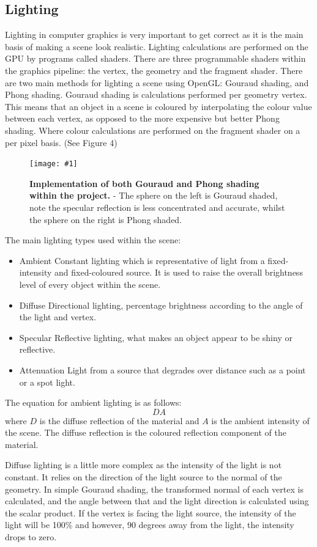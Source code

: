 \documentclass[conference]{acmsiggraph}
\newcommand{\figuremacroW}[4]{
	\begin{figure}[h] %
		\centering
		\texttt{[image: \#1]}
		\caption[#2]{\textbf{#2} - #3}
		\label{fig:#1}
	\end{figure}
}
\begin{document}
\subsection{Lighting}
Lighting in computer graphics is very important to get correct as it is the main basis of making a scene look realistic. Lighting calculations are performed on the GPU by programs called shaders. There are three programmable shaders within the graphics pipeline: the vertex, the geometry and the fragment shader.
    There are two main methods for lighting a scene using OpenGL: Gouraud shading, and Phong shading.
Gouraud shading is %
calculations performed per geometry vertex. This means that an object in a scene is coloured by interpolating the colour value between each vertex, as opposed to the more expensive but better Phong shading. Where colour calculations are performed on the fragment shader on a per pixel basis. (See Figure 4)

\figuremacroW
{gouraudPhong}
{Implementation of both Gouraud and Phong shading within the project. }
{The sphere on the left is Gouraud shaded, note the specular reflection is less concentrated and accurate, whilst the sphere on the right is Phong shaded.}
{1.0}

The main lighting types used within the scene:
\begin{itemize}
    \item {Ambient} Constant lighting which is representative of light from a fixed-intensity and fixed-coloured source. It is used to raise the overall brightness level of every object within the scene. 
    \item {Diffuse} Directional lighting, percentage brightness according to the angle of the light and vertex.
    \item {Specular} Reflective lighting, what makes an object appear to be shiny or reflective.
    \item {Attenuation} Light from a source that degrades over distance such as a point or a spot light.
\end{itemize}

The equation for ambient lighting is as follows:
\begin{equation} \label{ambientLightingEq}
    DA
\end{equation}
where $D$ is the diffuse reflection of the material and $A$ is the ambient intensity of the scene. The diffuse reflection is the coloured reflection component of the material.

Diffuse lighting is a little more complex as the intensity of the light is not constant. It relies on the direction of the light source to the normal of the geometry. In simple Gouraud shading, the transformed normal of each vertex is calculated, and the angle between that and the light direction is calculated using the scalar product. If the vertex is facing the light source, the intensity of the light will be 100\% and however, 90 degrees away from the light, the intensity drops to zero.
\end{document}
